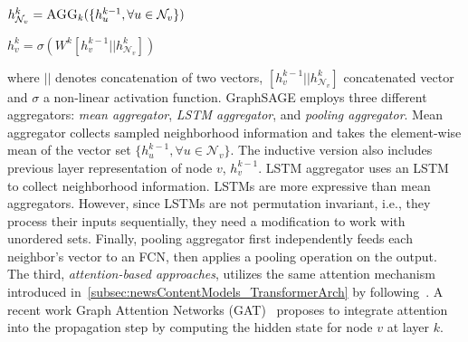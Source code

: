 \begin{center}
    $h_{\mathcal{N}_v}^{k} = \textsc{AGG}_{k}(\{h_u^{k-1}, \forall u \in \mathcal{N}_v\})$
\end{center}
\begin{center}
    $h_v^k = \sigma(W^k [h_v^{k-1} || h_{\mathcal{N}_v}^k])$
\end{center}
where $||$ denotes concatenation of two vectors, $[h_v^{k-1} || h_{\mathcal{N}_v}^k]$ concatenated vector and $\sigma$
a non-linear activation function. GraphSAGE employs three different aggregators: \emph{mean aggregator}, \emph{LSTM aggregator}, and \emph{pooling aggregator}. Mean aggregator collects sampled neighborhood information and takes the element-wise mean of the vector set $\{h_u^{k-1}, \forall u \in \mathcal{N}_v\}$. The inductive version also includes previous layer representation of node $v$, $h_v^{k-1}$. LSTM aggregator uses an LSTM to collect neighborhood information. LSTMs are more expressive than mean aggregators. However, since LSTMs are not permutation invariant, i.e., they process
their inputs sequentially, they need a modification to work with unordered sets. Finally, pooling aggregator first independently feeds each neighbor's vector to an FCN, then applies a pooling operation on the output.\\
The third, \emph{attention-based approaches}, utilizes the same attention mechanism introduced in~\ref{subsec:newsContentModels_TransformerArch} by following~\cite{NeuralMachineTranslationByJointlyLearning_Bahdanau}. A recent work Graph Attention Networks (GAT)~\parencite{GraphAttentionNetworks_Velickovic} proposes to integrate attention into the propagation step by computing the hidden state for node $v$ at layer $k$.
